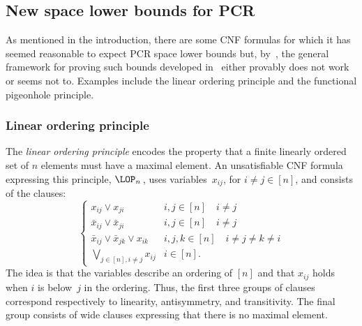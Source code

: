 \subsection{New space lower bounds for PCR}


As mentioned in the introduction, there are some CNF formulas for which it has seemed reasonable to expect PCR space lower bounds but, by~\cite{DBLP:conf/icalp/FilmusLMNV13}, the general framework for proving such bounds developed in~\cite{DBLP:journals/jacm/BonacinaG15} either provably does not work or seems not to. Examples include the linear ordering principle and the functional pigeonhole principle.


\subsubsection{Linear ordering principle}
The \emph{linear ordering principle} encodes the property that a finite linearly ordered set of $n$ elements 
must have a maximal element.
An unsatisfiable CNF formula expressing this principle, $\LOP_n$\,, uses variables~$x_{ij}$,
for $i\not =j \in [n]$, and consists of the clauses: 
$$
\left \{
\begin{array}{ll}
 x_{ij} \vee  x_{ji} & i,j\in[n] \quad i \not =j \\
\bar x_{ij} \vee \bar x_{ji} & i,j\in[n] \quad i \not =j \\
\bar x_{ij} \vee \bar x_{jk} \vee x_{ik} &  i,j,k \in [n] \quad i\not = j\not = k \not = i \\
\bigvee_{j\in [n], i\not =j} x_{ij} & i \in [n].
\end{array}
\right.
$$
The idea is that the variables describe an ordering of $[n]$ and that $x_{ij}$ holds when $i$ is 
below~$j$ in the ordering.
Thus, the first three groups of clauses correspond respectively
to linearity, antisymmetry, and transitivity.
The final group consists of wide clauses expressing that there is no maximal element. 

